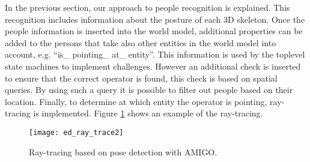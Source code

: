 In the previous section, our approach to people recognition is explained. This recognition includes information about the posture of each 3D skeleton. Once the people information is inserted into the world model, additional properties can be added to the persons that take also other entities in the world model into account, e.g. “is\_ pointing\_ at\_ entity”. This information is used by the toplevel state machines to implement challenges. However an additional check is inserted to ensure that the correct operator is found, this check is based on spatial queries. By using such a query it is possible to filter out people based on their location. Finally, to determine at which entity the operator is pointing, ray-tracing is implemented. Figure \ref{fig:ray_trace} shows an example of the ray-tracing.

\begin{figure}[H]
	\centering
    \texttt{[image: ed\_ray\_trace2]}
	\caption{Ray-tracing based on pose detection with AMIGO.}
	\label{fig:ray_trace}
\end{figure}


